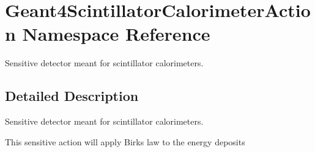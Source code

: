 \hypertarget{namespace_geant4_scintillator_calorimeter_action}{}\section{Geant4\+Scintillator\+Calorimeter\+Action Namespace Reference}
\label{namespace_geant4_scintillator_calorimeter_action}


Sensitive detector meant for scintillator calorimeters.  




\subsection{Detailed Description}
Sensitive detector meant for scintillator calorimeters. 

This sensitive action will apply Birks\textquotesingle{} law to the energy deposits 